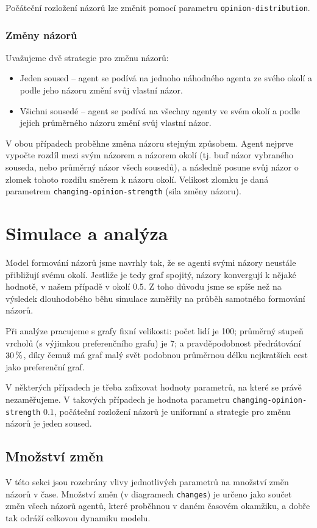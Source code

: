 \documentclass[10pt,a4paper]{report}
\begin{document}
Počáteční rozložení názorů lze změnit pomocí parametru \texttt{opinion-distri\-bution}. 

\subsection{Změny názorů}
Uvažujeme dvě strategie pro změnu názorů:

\begin{itemize}
	\item Jeden soused -- agent se podívá na jednoho náhodného agenta ze svého okolí a podle jeho názoru změní svůj vlastní názor.
	\item Všichni sousedé -- agent se podívá na všechny agenty ve svém okolí a podle jejich průměrného názoru změní svůj vlastní názor.
\end{itemize}

V obou případech proběhne změna názoru stejným způsobem. Agent nejprve vypočte rozdíl mezi svým názorem a názorem okolí (tj. buď názor vybraného souseda, nebo průměrný názor všech sousedů), a následně posune svůj názor o zlomek tohoto rozdílu směrem k názoru okolí. Velikost zlomku je daná parametrem \texttt{changing-opinion-strength} (sila změny názoru).








\chapter{Simulace a analýza}
Model formování názorů jsme navrhly tak, že se agenti svými názory neustále přibližují svému okolí. Jestliže je tedy graf spojitý, názory konvergují k nějaké hodnotě, v našem případě v okolí $0.5$. Z toho důvodu jsme se spíše než na výsledek dlouhodobého běhu simulace zaměřily na průběh samotného formování názorů.

Při analýze pracujeme s grafy fixní velikosti: počet lidí je 100; průměrný stupeň vrcholů (s výjimkou preferenčního grafu) je 7; a pravděpodobnost předrátování $30\thinspace\%$, díky čemuž má graf malý svět podobnou průměrnou délku nej\-kratších cest jako preferenční graf.

V některých případech je třeba zafixovat hodnoty parametrů, na které se právě nezaměřujeme. V takových případech je hodnota parametru \texttt{changing\--opinion\--strength} $0.1$, počáteční rozložení názorů je uniformní a strategie pro změnu názorů je jeden soused.

\section{Množství změn}
V této sekci jsou rozebrány vlivy jednotlivých parametrů na množství změn názorů v čase. Množství změn (v diagramech \texttt{changes}) je určeno jako součet změn všech názorů agentů, které proběhnou v daném časovém okamžiku, a dobře tak odráží celkovou dynamiku modelu.
\end{document}
